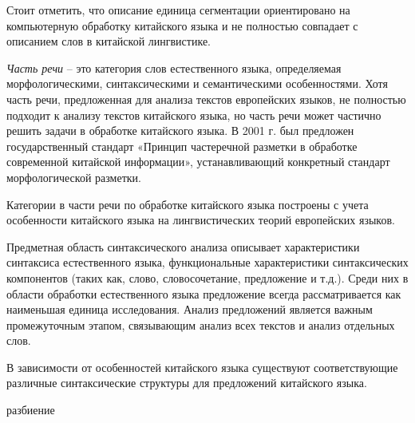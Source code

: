 Стоит отметить, что описание единица сегментации ориентировано на компьютерную обработку китайского языка и не полностью совпадает с описанием слов в китайской лингвистике.

\textit{Часть речи} -- это категория слов естественного языка, определяемая морфологическими, синтаксическими и семантическими особенностями. Хотя часть речи, предложенная для анализа текстов европейских языков, не полностью подходит к анализу текстов китайского языка, но часть речи может частично решить задачи в обработке китайского языка. В 2001 г. был предложен государственный стандарт «Принцип частеречной разметки
в обработке современной китайской информации», устанавливающий конкретный стандарт морфологической разметки. 
\begin{SCn}
\end{SCn}

Категории в части речи по обработке китайского языка построены с учета особенности китайского языка на лингвистических теорий европейских языков. 

Предметная область синтаксического анализа описывает характеристики синтаксиса естественного языка, функциональные характеристики синтаксических компонентов (таких как, слово, словосочетание, предложение и т.д.). Среди них в области обработки естественного языка предложение всегда рассматривается как наименьшая единица исследования. Анализ предложений является важным промежуточным этапом, связывающим анализ всех текстов и анализ отдельных слов. 

В зависимости от особенностей китайского языка существуют соответствующие различные синтаксические структуры для предложений китайского языка.

\begin{SCn}
	\begin{scnrelfromset}{разбиение}
	\end{scnrelfromset}
\end{SCn}

